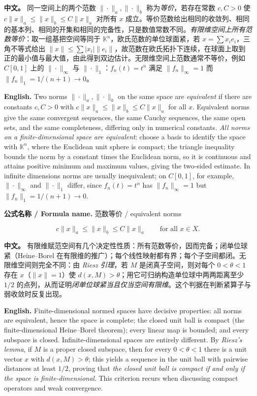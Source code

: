 \documentclass[UTF8,11pt,a4paper]{ctexart}
\newcommand{\FORMULA}[2]{\par\noindent\textbf{公式名称 / Formula name.} #1 / #2\par}
\newcommand{\APS}[2]{\par\noindent\textbf{中文。} #1\par\noindent\textbf{English.} #2\par\smallskip}
\begin{document}
\APS{同一空间上的两个范数 $\|\cdot\|_a,\|\cdot\|_b$ 称为\emph{等价}，若存在常数 $c,C>0$ 使 $c\|x\|_a\le\|x\|_b\le C\|x\|_a$ 对所有 $x$ 成立。等价范数给出相同的收敛列、相同的基本列、相同的开集和相同的完备性，只是数值常数不同。\emph{有限维空间上所有范数等价}：取一组基把空间等同于 $\mathbb K^n$，欧氏范数的单位球面紧，若 $x=\sum x_ie_i$，三角不等式给出 $\|x\|\le\sum |x_i|\|e_i\|$，故范数在欧氏拓扑下连续，在球面上取到正的最小值与最大值，由此得到双边估计。无限维空间上范数通常不等价，例如 $C[0,1]$ 上的 $\|\cdot\|_\infty$ 与 $\|\cdot\|_1$：$f_n(t)=t^n$ 满足 $\|f_n\|_\infty=1$ 而 $\|f_n\|_1=1/(n+1)\to0$。}{Two norms $\|\cdot\|_a,\|\cdot\|_b$ on the same space are \emph{equivalent} if there are constants $c,C>0$ with $c\|x\|_a\le\|x\|_b\le C\|x\|_a$ for all $x$. Equivalent norms give the same convergent sequences, the same Cauchy sequences, the same open sets, and the same completeness, differing only in numerical constants. \emph{All norms on a finite-dimensional space are equivalent}: choose a basis to identify the space with $\mathbb K^n$, where the Euclidean unit sphere is compact; the triangle inequality bounds the norm by a constant times the Euclidean norm, so it is continuous and attains positive minimum and maximum values, giving the two-sided estimate. In infinite dimensions norms are usually inequivalent; on $C[0,1]$, for example, $\|\cdot\|_\infty$ and $\|\cdot\|_1$ differ, since $f_n(t)=t^n$ has $\|f_n\|_\infty=1$ but $\|f_n\|_1=1/(n+1)\to0$.}
\FORMULA{范数等价}{equivalent norms}
\[
c\|x\|_a\le\|x\|_b\le C\|x\|_a\qquad\text{for all }x\in X.
\]

\APS{有限维赋范空间有几个决定性性质：所有范数等价，因而完备；闭单位球紧（Heine--Borel 在有限维的推广）；每个线性映射都有界；每个子空间都闭。无限维空间则完全不同：由 \emph{Riesz 引理}，若 $M$ 是闭真子空间，则对每个 $0<\theta<1$ 存在 $x$（$\|x\|=1$）使 $d(x,M)>\theta$；用它可归纳构造单位球中两两距离至少 $1/2$ 的点列，从而证明\emph{闭单位球紧当且仅当空间有限维}。这个判据在判断紧算子与弱收敛时反复出现。}{Finite-dimensional normed spaces have decisive properties: all norms are equivalent, hence the space is complete; the closed unit ball is compact (the finite-dimensional Heine--Borel theorem); every linear map is bounded; and every subspace is closed. Infinite-dimensional spaces are entirely different. By \emph{Riesz's lemma}, if $M$ is a proper closed subspace, then for every $0<\theta<1$ there is a unit vector $x$ with $d(x,M)>\theta$; this yields a sequence in the unit ball with pairwise distances at least $1/2$, proving that \emph{the closed unit ball is compact if and only if the space is finite-dimensional}. This criterion recurs when discussing compact operators and weak convergence.}
\end{document}
